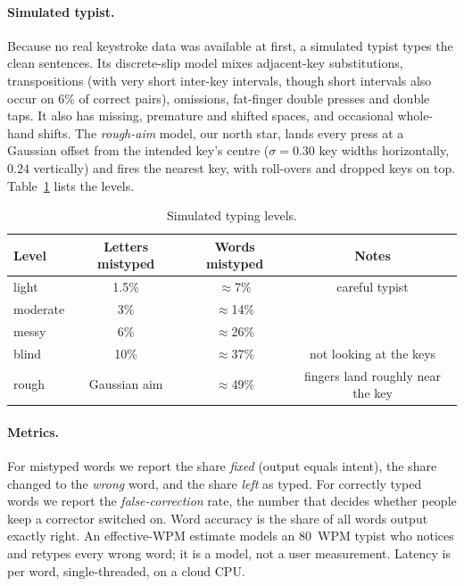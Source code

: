 \documentclass[11pt,a4paper]{article}
\begin{document}
\paragraph{Simulated typist.} Because no real keystroke data was available at first, a simulated typist types the clean sentences. Its discrete-slip model mixes adjacent-key substitutions, transpositions (with very short inter-key intervals, though short intervals also occur on 6\% of correct pairs), omissions, fat-finger double presses and double taps. It also has missing, premature and shifted spaces, and occasional whole-hand shifts. The \emph{rough-aim} model, our north star, lands every press at a Gaussian offset from the intended key's centre ($\sigma=0.30$ key widths horizontally, $0.24$ vertically) and fires the nearest key, with roll-overs and dropped keys on top. Table~\ref{tab:levels} lists the levels.

\begin{table}[t]
\centering\small
\caption{Simulated typing levels.}
\label{tab:levels}
\begin{tabular}{lccc}
\toprule
Level & Letters mistyped & Words mistyped & Notes \\
\midrule
light & 1.5\% & $\approx$7\% & careful typist \\
moderate & 3\% & $\approx$14\% & \\
messy & 6\% & $\approx$26\% & \\
blind & 10\% & $\approx$37\% & not looking at the keys \\
rough & Gaussian aim & $\approx$49\% & fingers land roughly near the key \\
\bottomrule
\end{tabular}
\end{table}

\paragraph{Metrics.} For mistyped words we report the share \emph{fixed} (output equals intent), the share changed to the \emph{wrong} word, and the share \emph{left} as typed. For correctly typed words we report the \emph{false-correction} rate, the number that decides whether people keep a corrector switched on. Word accuracy is the share of all words output exactly right. An effective-WPM estimate models an 80~WPM typist who notices and retypes every wrong word; it is a model, not a user measurement. Latency is per word, single-threaded, on a cloud CPU.
\end{document}
